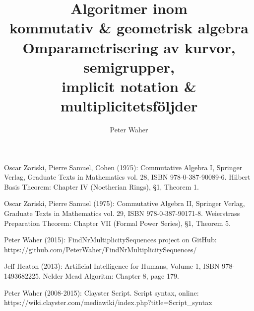 \documentclass[twoside]{report}
\title{Algoritmer inom \\
	kommutativ \& geometrisk algebra \\[20pt]
	\large Omparametrisering av kurvor, semigrupper, \\
	implicit notation \& multiplicitetsföljder}
\author{Peter Waher}
\begin{document}
\maketitle

\begin{abstract}
\end{abstract}

\tableofcontents{}







\appendix{}






\begin{thebibliography}{99}
 Oscar Zariski, Pierre Samuel, Cohen (1975): Commutative Algebra I, Springer Verlag, Graduate Texts in Mathematics vol. 28, ISBN 978-0-387-90089-6. Hilbert Basis Theorem: Chapter IV (Noetherian Rings), §1, Theorem 1.

 Oscar Zariski, Pierre Samuel (1975): Commutative Algebra II, Springer Verlag, Graduate Texts in Mathematics vol. 29, ISBN 978-0-387-90171-8. Weierstrass Preparation Theorem: Chapter VII (Formal Power Series), §1, Theorem 5.

 Peter Waher (2015): FindNrMultiplicitySequences project on GitHub: https://github.com/PeterWaher/FindNrMultiplicitySequences/

 Jeff Heaton (2013): Artificial Intelligence for Humans, Volume 1, ISBN 978-1493682225. Nelder Mead Algoritm: Chapter 8, page 179.

 Peter Waher (2008-2015): Clayster Script. Script syntax, online: https://wiki.clayster.com/mediawiki/index.php?title=Script\_syntax

\end{thebibliography}
\end{document}
